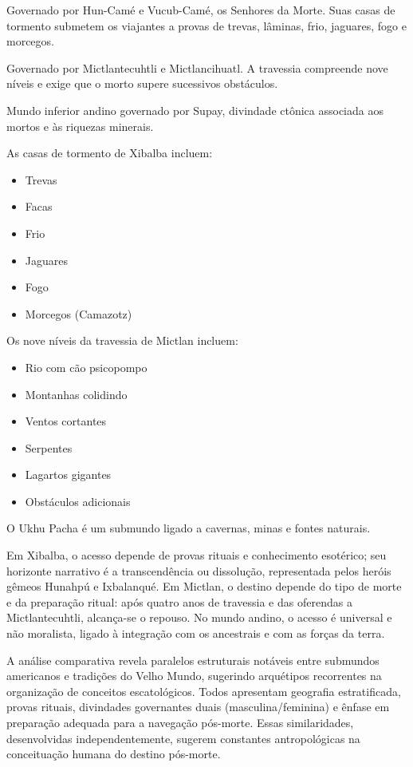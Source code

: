 \begin{description}[leftmargin=2.8cm,style=nextline]
  \item[Xibalba] Governado por Hun-Camé e Vucub-Camé, os Senhores da Morte.
  Suas casas de tormento submetem os viajantes a provas de trevas, lâminas,
  frio, jaguares, fogo e morcegos.
  \item[Mictlan] Governado por Mictlantecuhtli e Mictlancihuatl. A travessia
  compreende nove níveis e exige que o morto supere sucessivos obstáculos.
  \item[Ukhu Pacha] Mundo inferior andino governado por Supay, divindade
  ctônica associada aos mortos e às riquezas minerais.
\end{description}

As casas de tormento de Xibalba incluem:

\begin{itemize}
  \item Trevas
  \item Facas
  \item Frio
  \item Jaguares
  \item Fogo
  \item Morcegos (Camazotz)
\end{itemize}
Os nove níveis da travessia de Mictlan incluem:

\begin{itemize}
  \item Rio com cão psicopompo
  \item Montanhas colidindo
  \item Ventos cortantes
  \item Serpentes
  \item Lagartos gigantes
  \item Obstáculos adicionais
\end{itemize}
O Ukhu Pacha é um submundo ligado a cavernas, minas e fontes naturais.

Em Xibalba, o acesso depende de provas rituais e conhecimento esotérico;
seu horizonte narrativo é a transcendência ou dissolução, representada
pelos heróis gêmeos Hunahpú e Ixbalanqué. Em Mictlan, o destino depende do
tipo de morte e da preparação ritual: após quatro anos de travessia e das
oferendas a Mictlantecuhtli, alcança-se o repouso. No mundo andino, o acesso
é universal e não moralista, ligado à integração com os ancestrais e com as
forças da terra.

A análise comparativa revela paralelos estruturais notáveis entre submundos americanos e tradições do Velho Mundo, sugerindo arquétipos recorrentes na organização de conceitos escatológicos. Todos apresentam geografia estratificada, provas rituais, divindades governantes duais (masculina/feminina) e ênfase em preparação adequada para a navegação pós-morte. Essas similaridades, desenvolvidas independentemente, sugerem constantes antropológicas na conceituação humana do destino pós-morte.


